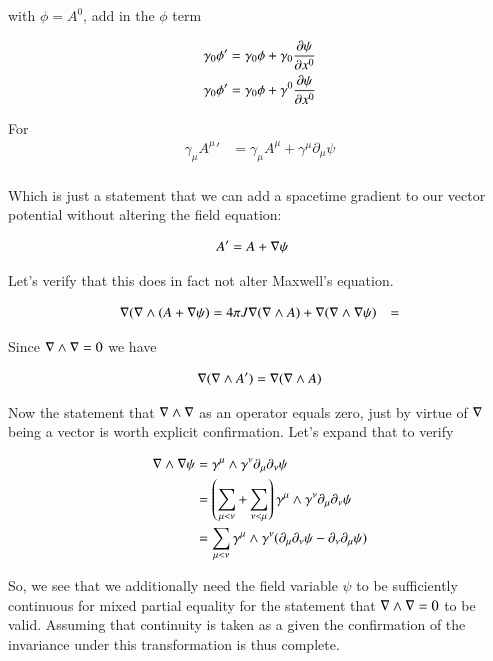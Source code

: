 with $\phi = A^0$, add in the $\phi$ term

\begin{align*}
\gamma_0 \phi' &= \gamma_0 \phi + \gamma_0 \frac{\partial {\psi}}{\partial {x^0}} \\
\gamma_0 \phi' &= \gamma_0 \phi + \gamma^0 \frac{\partial {\psi}}{\partial {x^0}}
\end{align*}

For
\begin{align*}
\gamma_\mu {A^\mu}' &= \gamma_\mu A^\mu + \gamma^\mu \partial_\mu \psi \\
\end{align*}

Which is just a statement that we can add a spacetime gradient to our vector potential without altering the field equation:

\begin{align*}
A' &= A + \nabla \psi
\end{align*}

Let's verify that this does in fact not alter Maxwell's equation.

\begin{align*}
\nabla (\nabla \wedge (A + \nabla \psi) &= 4 \pi J
\nabla (\nabla \wedge A) + \nabla (\nabla \wedge \nabla \psi) &= 
\end{align*}

Since $\nabla \wedge \nabla = 0$ we have

\begin{align*}
\nabla (\nabla \wedge A') = \nabla (\nabla \wedge A)
\end{align*}

Now the statement that $\nabla \wedge \nabla$ as an operator equals zero, just by virtue of $\nabla$ being a vector is worth explicit
confirmation.  Let's expand that to verify

\begin{align*}
\nabla \wedge \nabla \psi 
&= \gamma^\mu \wedge \gamma^\nu \partial_\mu \partial_\nu \psi \\
&= \left(\sum_{\mu < \nu} + \sum_{\nu < \mu}\right) \gamma^\mu \wedge \gamma^\nu \partial_\mu \partial_\nu \psi \\
&= \sum_{\mu < \nu} \gamma^\mu \wedge \gamma^\nu (\partial_\mu \partial_\nu \psi - \partial_\nu \partial_\mu \psi) \\
\end{align*}

So, we see that we additionally need the field variable $\psi$ to be sufficiently continuous for mixed partial equality for the
statement that $\nabla \wedge \nabla = 0$ to be valid.  Assuming that continuity is taken as a given the confirmation of the invariance under this transformation is thus complete.


